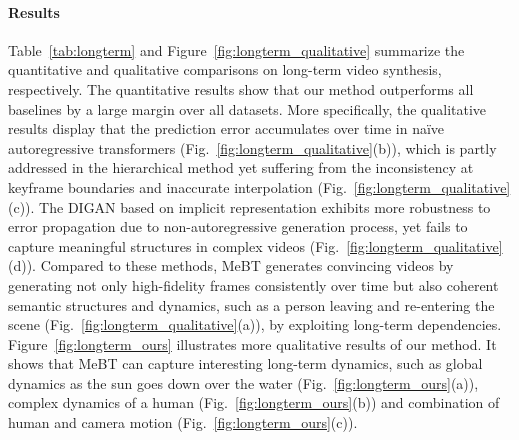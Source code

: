 \documentclass[10pt,twocolumn,letterpaper]{article}
\newcommand{\cutparagraphup}{\vspace*{-0.1in}}
\begin{document}
\cutparagraphup
\paragraph{Results}
Table~\ref{tab:longterm} and Figure~\ref{fig:longterm_qualitative} summarize the quantitative and qualitative comparisons on long-term video synthesis, respectively.
The quantitative results show that our method outperforms all baselines by a large margin over all datasets.
More specifically, the qualitative results display that the prediction error accumulates over time in na\"ive autoregressive transformers (Fig.~\ref{fig:longterm_qualitative}(b)), which is partly addressed in the hierarchical method yet suffering from the inconsistency at keyframe boundaries and inaccurate interpolation (Fig.~\ref{fig:longterm_qualitative}(c)). 
The DIGAN based on implicit representation exhibits more robustness to error propagation due to non-autoregressive generation process, yet fails to capture meaningful structures in complex videos (Fig.~\ref{fig:longterm_qualitative}(d)).
Compared to these methods, MeBT generates convincing videos by generating not only high-fidelity frames consistently over time but also coherent semantic structures and dynamics, such as a person leaving and re-entering the scene (Fig.~\ref{fig:longterm_qualitative}(a)), by exploiting long-term dependencies.
Figure~\ref{fig:longterm_ours} illustrates more qualitative results of our method.
It shows that MeBT can capture interesting long-term dynamics, such as global dynamics as the sun goes down over the water (Fig.~\ref{fig:longterm_ours}(a)), complex dynamics of a human (Fig.~\ref{fig:longterm_ours}(b)) and combination of human and camera motion (Fig.~\ref{fig:longterm_ours}(c)).
\end{document}
